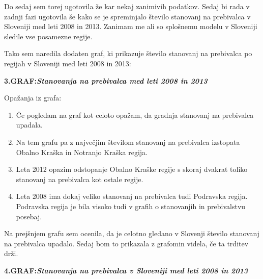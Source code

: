 \documentclass[11pt,a4paper]{article}
\begin{document}
Do sedaj sem torej ugotovila že kar nekaj zanimivih podatkov. Sedaj bi rada v zadnji fazi ugotovila še kako se je spreminjalo število stanovanj na prebivalca v Sloveniji med leti 2008 in 2013. Zanimam me ali so splošnemu modelu v Sloveniji sledile vse posamezne regije.

\newpage
Tako sem naredila dodaten graf, ki prikazuje število stanovanj na prebivalca po regijah v Sloveniji med leti 2008 in 2013:

\textbf{3.GRAF:\emph{Stanovanja na prebivalca med leti 2008 in 2013}}

\makebox[\textwidth][c]{

}

Opažanja iz grafa:
\begin{enumerate}
\item{Če pogledam na graf kot celoto opažam, da gradnja stanovanj na prebivalca upadala.}
\item{Na tem grafu pa z največjim številom stanovanj na prebivalca izstopata Obalno Kraška in Notranjo Kraška regija.}
\item{Leta 2012 opazim odstopanje Obalno Kraške regije s skoraj dvakrat toliko stanovanj na prebivalca kot ostale regije.}
\item{Leta 2008 ima dokaj veliko stanovanj na prebivalca tudi Podravska regija. Podravska regija je bila visoko tudi v grafih o stanovanjih in prebivalstvu posebaj.}
\end{enumerate}

\newpage
Na prejšnjem grafu sem ocenila, da je celotno gledano v Slovenji število stanovanj na prebivalca upadalo. Sedaj bom to prikazala z grafomin videla, če ta trditev drži.

\textbf{4.GRAF:\emph{Stanovanja na prebivalca v Sloveniji med leti 2008 in 2013}}

\makebox[\textwidth][c]{

}
\end{document}
